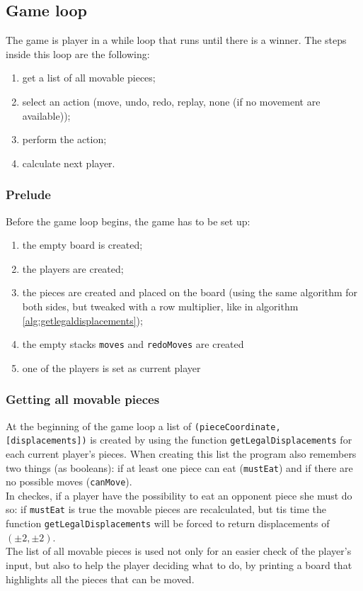 \documentclass[10pt, a4paper]{article}
\begin{document}
	\subsection{Game loop}
	The game is player in a while loop that runs until there is a winner. The steps inside this loop are the following:
	\begin{enumerate}
		\item get a list of all movable pieces;
		\item select an action (move, undo, redo, replay, none (if no movement are available));
		\item perform the action;
		\item calculate next player.
	\end{enumerate}
	
	\subsubsection{Prelude}
	\label{subsubsec:prelude}
	Before the game loop begins, the game has to be set up:
	\begin{enumerate}
		\item the empty board is created;
		\item the players are created;
		\item the pieces are created and placed on the board (using the same algorithm for both sides, but tweaked with a row multiplier, like in algorithm \ref{alg:getlegaldisplacements});
		\item the empty stacks \texttt{moves} and \texttt{redoMoves} are created
		\item one of the players is set as current player
	\end{enumerate}
	
	\subsubsection{Getting all movable pieces}
	At the beginning of the game loop a list of \texttt{(pieceCoordinate, [displacements])} is created by using the function \texttt{getLegalDisplacements} for each current player's pieces. When creating this list the program also remembers two things (as booleans): if at least one piece can eat (\texttt{mustEat}) and if there are no possible moves (\texttt{canMove}).\\
	In checkes, if a player have the possibility to eat an opponent piece she must do so: if \texttt{mustEat} is true the movable pieces are recalculated, but tis time the function \texttt{getLegalDisplacements} will be forced to return displacements of \((\pm2, \pm2)\).\\
	The list of all movable pieces is used not only for an easier check of the player's input, but also to help the player deciding what to do, by printing a board that highlights all the pieces that can be moved.
	
\end{document}
